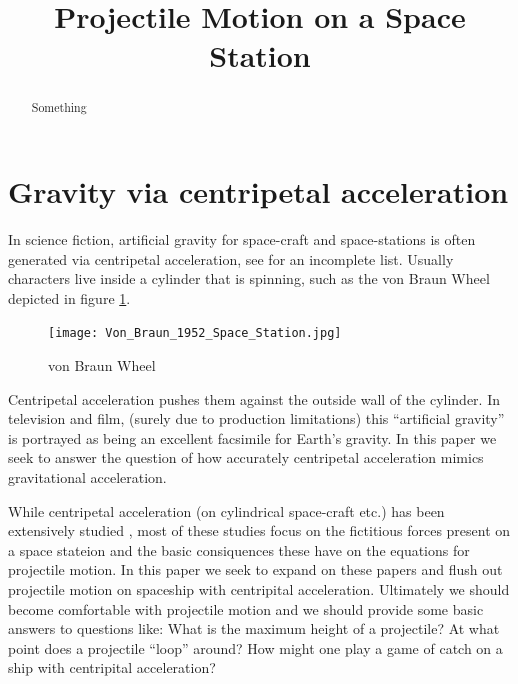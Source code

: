 \documentclass{amsart}
\title{Projectile Motion on a Space Station}
\theoremstyle{definition}
\begin{document}
\begin{abstract}
 Something
\end{abstract}
\maketitle


\section{Gravity via centripetal acceleration}


In science fiction, artificial gravity for space-craft and
space-stations is often generated via centripetal acceleration, see
\cite{2001,2010,missiontomars,themartian,expanse,babylon5,europareport,ringworld?,rama,intersetller,etc}
for an incomplete list. Usually characters live inside a cylinder that
is spinning, such as the von Braun Wheel depicted in figure
\ref{fig:Braun Wheel}.

\begin{figure}[h]
  \centering
  \texttt{[image: Von\_Braun\_1952\_Space\_Station.jpg]}
  \caption{von Braun Wheel}
  \label{fig:Braun Wheel}
\end{figure}

Centripetal acceleration pushes them against the outside wall of the
cylinder. In television and film, (surely due to production
limitations) this ``artificial gravity'' is portrayed as being an
excellent facsimile for Earth's gravity. In this paper we seek to
answer the question of how accurately centripetal acceleration mimics
gravitational acceleration.





While centripetal acceleration (on cylindrical space-craft etc.) has
been extensively studied \cite{papers,anotherpaper}, most of these
studies focus on the fictitious forces present on a space stateion and
the basic consiquences these have on the equations for projectile
motion. In this paper we seek to expand on these papers and flush out projectile motion on
spaceship with centripital acceleration. Ultimately we should become
comfortable with projectile motion and we should provide some basic
answers to questions like: What is the maximum height of a projectile?
At what point does a projectile ``loop'' around? How might one play a
game of catch on a ship with centripital acceleration?
\end{document}
